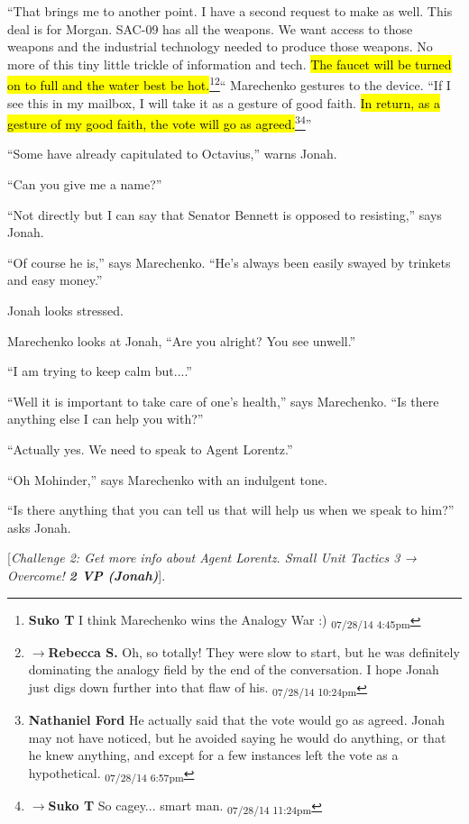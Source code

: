 ``That brings me to another point.  I have a second request to make as well.  This deal is for Morgan.  SAC-09 has all the weapons.  We want access to those weapons and the industrial technology needed to produce those weapons.  No more of this tiny little trickle of information and tech.  \hl{The faucet will be turned on to full and the water best be hot.}\footnote{\textbf{Suko T }I think Marechenko wins the Analogy War :) \textsubscript{07/28/14 4:45pm}}\footnote{$\rightarrow$\textbf{Rebecca S. }Oh, so totally! They were slow to start, but he was definitely dominating the analogy field by the end of the conversation.  I hope Jonah just digs down further into that flaw of his. \textsubscript{07/28/14 10:24pm}}``  Marechenko gestures to the device.  ``If I see this in my mailbox, I will take it as a gesture of good faith.  \hl{In return, as a gesture of my good faith, the vote will go as agreed.}\footnote{\textbf{Nathaniel Ford }He actually said that the vote would go as agreed. Jonah may not have noticed, but he avoided saying he would do anything, or that he knew anything, and except for a few instances left the vote as a hypothetical. \textsubscript{07/28/14 6:57pm}}\footnote{$\rightarrow$\textbf{Suko T }So cagey... smart man. \textsubscript{07/28/14 11:24pm}}''

``Some have already capitulated to Octavius,'' warns Jonah.

``Can you give me a name?''

``Not directly but I can say that Senator Bennett is opposed to resisting,'' says Jonah.  

``Of course he is,'' says Marechenko.  ``He's always been easily swayed by trinkets and easy money.''

Jonah looks stressed.

Marechenko looks at Jonah, ``Are you alright?  You see unwell.''

``I am trying to keep calm but....''

``Well it is important to take care of one's health,'' says Marechenko.  ``Is there anything else I can help you with?''

``Actually yes.  We need to speak to Agent Lorentz.''

``Oh Mohinder,'' says Marechenko with an indulgent tone.

``Is there anything that you can tell us that will help us when we speak to him?'' asks Jonah.

{[}\textit{Challenge 2: Get more info about Agent Lorentz.  Small Unit Tactics 3 → Overcome! }\textit{\textbf{2 VP (Jonah)}}{]}.  

